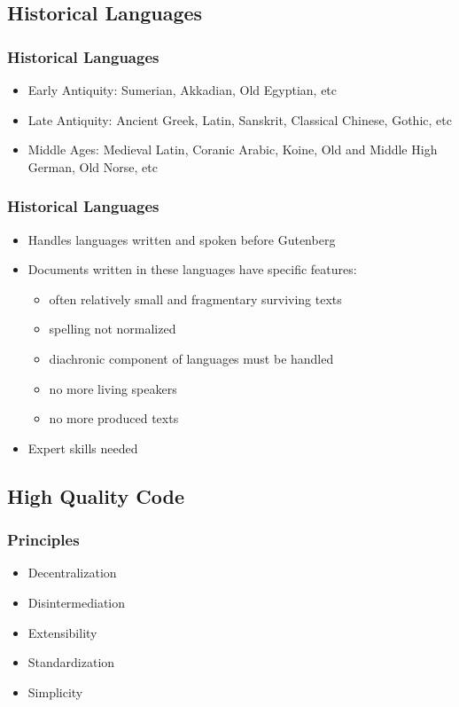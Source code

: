 \documentclass{beamer}
\begin{document}
\subsection{Historical Languages}

\begin{frame}
\frametitle{Historical Languages}
\begin{itemize}
    \item Early Antiquity: Sumerian, Akkadian, Old Egyptian, etc
    \item Late Antiquity: Ancient Greek, Latin, Sanskrit, Classical Chinese, Gothic, etc
    \item Middle Ages: Medieval Latin, Coranic Arabic, Koine, Old and Middle High German, Old Norse, etc
\end{itemize}
\end{frame}

\begin{frame}
\frametitle{Historical Languages}
\begin{itemize}
    \item Handles languages written and spoken before Gutenberg
    \item Documents written in these languages have specific features:   
    \begin{itemize}
        \item often relatively small and fragmentary surviving texts
        \item spelling not normalized
        \item diachronic component of languages must be handled
        \item no more living speakers
        \item no more produced texts
    \end{itemize}
    \item Expert skills needed
\end{itemize}
\end{frame}


\subsection{High Quality Code}

\begin{frame}
\frametitle{Principles}
\begin{itemize}
    \item Decentralization
    \item Disintermediation
    \item Extensibility
    \item Standardization
    \item Simplicity
\end{itemize}{}
    
\end{frame}
\end{document}
